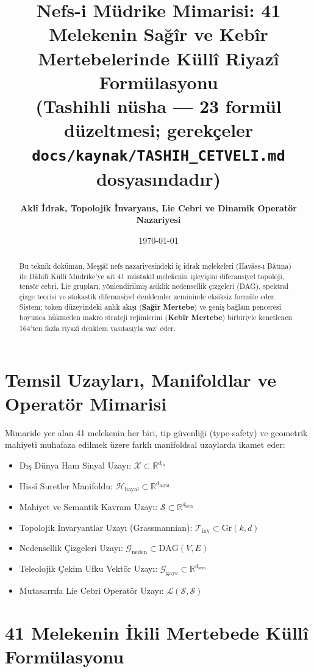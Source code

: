 \documentclass[11pt, a4paper]{article}
\title{\textbf{Nefs-i Müdrike Mimarisi: 41 Melekenin Sağîr ve Kebîr Mertebelerinde Küllî Riyazî Formülasyonu}\\ \normalsize\textmd{(Tashihli nüsha --- 23 formül düzeltmesi; gerekçeler \texttt{docs/kaynak/TASHIH\_CETVELI.md} dosyasındadır)}}
\author{\textbf{Aklî İdrak, Topolojik İnvaryans, Lie Cebri ve Dinamik Operatör Nazariyesi}}
\date{\today}
\begin{document}
\maketitle

\begin{abstract}
Bu teknik doküman, Meşşâî nefs nazariyesindeki iç idrak melekeleri (Havâss-ı Bâtına) ile Dâhilî Küllî Müdrike'ye ait 41 müstakil melekenin işleyişini diferansiyel topoloji, tensör cebri, Lie grupları, yönlendirilmiş asiklik nedensellik çizgeleri (DAG), spektral çizge teorisi ve stokastik diferansiyel denklemler zemininde eksiksiz formüle eder. Sistem; token düzeyindeki anlık akışı (\textbf{Sağîr Mertebe}) ve geniş bağlam penceresi boyunca hükmeden makro strateji rejimlerini (\textbf{Kebîr Mertebe}) birbiriyle kenetlenen 164'ten fazla riyazî denklem vasıtasıyla vaz' eder.
\end{abstract}

\section{Temsil Uzayları, Manifoldlar ve Operatör Mimarisi}

Mimaride yer alan 41 melekenin her biri, tip güvenliği (type-safety) ve geometrik mahiyeti muhafaza edilmek üzere farklı manifoldsal uzaylarda ikamet eder:
\begin{itemize}
    \item Dış Dünya Ham Sinyal Uzayı: $\mathcal{X} \subset \mathbb{R}^{d_{\text{in}}}$
    \item Hissî Suretler Manifoldu: $\mathcal{H}_{\text{hayal}} \subset \mathbb{R}^{d_{\text{hayal}}}$
    \item Mahiyet ve Semantik Kavram Uzayı: $\mathcal{S} \subset \mathbb{R}^{d_{\text{sem}}}$
    \item Topolojik İnvaryantlar Uzayı (Grassmannian): $\mathcal{T}_{\text{inv}} \subset \text{Gr}(k, d)$
    \item Nedensellik Çizgeleri Uzayı: $\mathcal{G}_{\text{neden}} \subset \text{DAG}(V, E)$
    \item Teleolojik Çekim Ufku Vektör Uzayı: $\mathcal{G}_{\text{gaye}} \subset \mathbb{R}^{d_{\text{sem}}}$
    \item Mutasarrıfa Lie Cebri Operatör Uzayı: $\mathcal{L}(\mathcal{S}, \mathcal{S})$
\end{itemize}

\section{41 Melekenin İkili Mertebede Küllî Formülasyonu}
\end{document}
